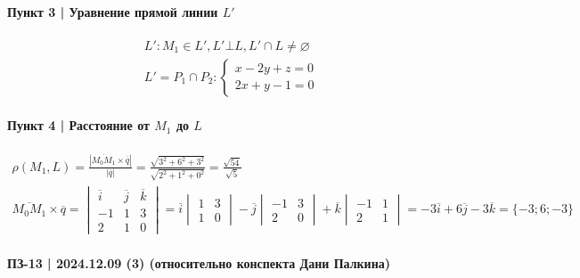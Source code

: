 \documentclass{article}
\begin{document}
\paragraph{Пункт 3 | Уравнение прямой линии $L'$}
\begin{gather*}
    L': M_1 \in L', L' \bot L, L' \cap L \neq \varnothing \\
    L' = P_1 \cap P_2: \begin{cases}
         x - 2y + z = 0 \\
        2x +  y - 1 = 0
    \end{cases}
\end{gather*}

\paragraph{Пункт 4 | Расстояние от $M_1$ до $L$}
\begin{gather*}
    \rho(M_1, L) =
    \frac{\left| \overline{M_0 M_1} \times \overline{q} \right|}{\left| \overline{q} \right|} =
    \frac{\sqrt{3^2 + 6^2 + 3^2}}{\sqrt{2^2 + 1^2 + 0^2}} =
    \frac{\sqrt{54}}{\sqrt{5}} \\
    \overline{M_0 M_1} \times \overline{q} =
    \begin{vmatrix}
        \overline{i} & \overline{j} & \overline{k} \\
                  -1 &           1  &           3  \\
                   2 &           1  &           0
    \end{vmatrix} =
    \overline{i} \begin{vmatrix}
        1 & 3 \\
        1 & 0
    \end{vmatrix} -
    \overline{j} \begin{vmatrix}
        -1 & 3 \\
         2 & 0
    \end{vmatrix} +
    \overline{k} \begin{vmatrix}
        -1 & 1 \\
         2 & 1
    \end{vmatrix} =
    -3 \overline{i} + 6 \overline{j} - 3 \overline{k} = \{-3; 6; -3\}
\end{gather*}




\newpage
\paragraph{ПЗ-13 | 2024.12.09 (3) (относительно конспекта Дани Палкина)}
\end{document}
